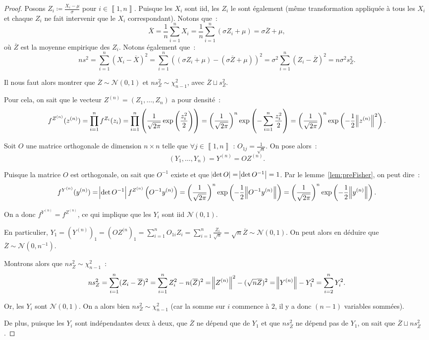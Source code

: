 \documentclass{report}
\newcommand{\Nzo}{\mathcal N(0, 1)}
\newcommand{\intint}[2]{\left\llbracket#1, #2\right\rrbracket}
\theoremstyle{definition}
\theoremstyle{remark}
\begin{document}
		\begin{proof} Posons $Z_i \coloneqq \frac {X_i - \mu}\sigma$ pour $i \in \intint 1n$. Puisque les $X_i$ sont iid, les $Z_i$ le sont également (même
		transformation appliquée à tous les $X_i$ et chaque $Z_i$ ne fait intervenir que le $X_i$ correspondant). Notons que~:
		\[\overline X = \frac 1n\sum_{i=1}^nX_i = \frac 1n\sum_{i=1}^n\left(\sigma Z_i + \mu\right) = \sigma\overline Z + \mu,\]
		où $\overline Z$ est la moyenne empirique des $Z_i$. Notons également que~:
		\[ns^2 = \sum_{i=1}^n(X_i - \overline X)^2 = \sum_{i=1}^n\left(\left(\sigma Z_i + \mu\right) - \left(\sigma\overline Z + \mu\right)\right)^2
			= \sigma^2\sum_{i=1}^n\left(Z_i - \overline Z\right)^2 = n\sigma^2s_Z^2.\]

		Il nous faut alors montrer que $\overline Z \sim \Nzo$ et $ns_Z^2 \sim \chi^2_{n-1}$, avec $\overline Z \sqcup s_Z^2$.

		Pour cela, on sait que le vecteur $Z^{(n)} = (Z_1, \ldots, Z_n)$ a pour densité~:
		\[f^{Z^{(n)}}(z^{(n)}) = \prod_{i=1}^nf^{Z_i}(z_i) = \prod_{i=1}^n\left(\frac 1{\sqrt {2\pi}}\exp\left(\frac {z_i^2}2\right)\right)
			= \left(\frac 1{\sqrt {2\pi}}\right)^n\exp\left(-\sum_{i=1}^n\frac {z_i^2}2\right)
			= \left(\frac 1{\sqrt {2\pi}}\right)^n\exp\left(-\frac 12\norm {z^{(n)}}^2\right).\]

		Soit $O$ une matrice orthogonale de dimension $n \times n$ telle que $\forall j \in \intint 1n$ : $O_{1j} = \frac 1{\sqrt n}$. On pose alors~:
		\[(Y_1, \ldots, Y_n) = Y^{(n)} = OZ^{(n)}.\]

		Puisque la matrice $O$ est orthogonale, on sait que $O^{-1}$ existe et que $\abs {\det O} = \abs {\det O^{-1}} = 1$. Par le lemme~\ref{lem:preFisher},
		on peut dire~:
		\[f^{Y^{(n)}}(y^{(n)}) = \abs {\det O^{-1}}f^{Z^{(n)}}\left(O^{-1}y^{(n)}\right)
			= \left(\frac 1{\sqrt {2\pi}}\right)^n\exp\left(-\frac 12\norm {O^{-1}y^{(n)}}\right)
			= \left(\frac 1{\sqrt {2\pi}}\right)^n\exp\left(-\frac 12\norm {y^{(n)}}\right).\]

		On a donc $f^{Y^{(n)}} = f^{Z^{(n)}}$, ce qui implique que les $Y_i$ sont iid $\Nzo$.

		En particulier, $Y_1 = (Y^{(n)})_1 = (OZ^{(n})_1 = \sum_{i=1}^nO_{1i}Z_i = \sum_{i=1}^n\frac {Z_i}{\sqrt n} = \sqrt n\overline Z \sim \Nzo$.
		On peut alors en déduire que $\overline Z \sim \mathcal N(0, n^{-1})$.

		Montrons alors que $ns_Z^2 \sim \chi^2_{n-1}$~:
		\[ns_Z^2 = \sum_{i=1}^n(Z_i - \overline Z)^2 = \sum_{i=1}^nZ_i^2 - n(\overline Z)^2 = \norm {Z^{(n)}}^2 - (\sqrt n\overline Z)^2 = \norm{Y^{(n)}} - Y_1^2
			= \sum_{i=2}^nY_i^2.\]

		Or, les $Y_i$ sont $\Nzo$. On a alors bien $ns_Z^2 \sim \chi^2_{n-1}$ (car la somme sur $i$ commence à $2$, il y a donc $(n-1)$ variables sommées).

		De plus, puisque les $Y_i$ sont indépendantes deux à deux, que $\overline Z$ ne dépend que de $Y_1$ et que $ns_Z^2$ ne dépend pas de $Y_1$, on sait que
		$\overline Z \sqcup ns_Z^2$.
		\end{proof}
\end{document}
